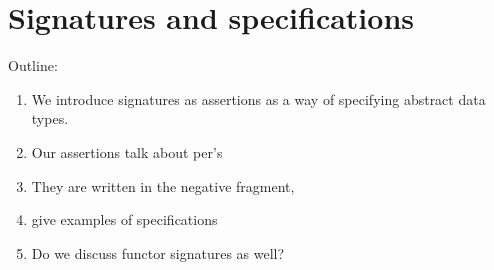 \section{Signatures and specifications}
\label{sec:sing-spec}

Outline:
%
\begin{enumerate}
\item We introduce signatures as assertions as a way of specifying
  abstract data types.
\item Our assertions talk about per's
\item They are written in the negative fragment,
\item give examples of specifications
\item Do we discuss functor signatures as well?
\end{enumerate}




